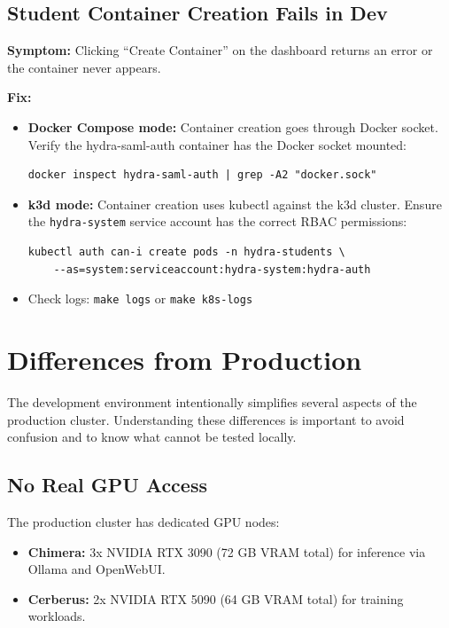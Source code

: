 \documentclass[11pt,a4paper]{article}
\newcommand{\cmdref}[1]{\texttt{#1}}
\begin{document}
\subsection{Student Container Creation Fails in Dev}

\textbf{Symptom:} Clicking ``Create Container'' on the dashboard returns
an error or the container never appears.

\textbf{Fix:}

\begin{itemize}[leftmargin=2em]
    \item \textbf{Docker Compose mode:} Container creation goes through
          Docker socket. Verify the hydra-saml-auth container has the
          Docker socket mounted:
\begin{lstlisting}[style=bash]
docker inspect hydra-saml-auth | grep -A2 "docker.sock"
\end{lstlisting}
    \item \textbf{k3d mode:} Container creation uses kubectl against the
          k3d cluster. Ensure the \texttt{hydra-system} service account
          has the correct RBAC permissions:
\begin{lstlisting}[style=bash]
kubectl auth can-i create pods -n hydra-students \
    --as=system:serviceaccount:hydra-system:hydra-auth
\end{lstlisting}
    \item Check logs: \cmdref{make logs} or \cmdref{make k8s-logs}
\end{itemize}

\section{Differences from Production}
\label{sec:differences}

The development environment intentionally simplifies several aspects of
the production cluster. Understanding these differences is important to
avoid confusion and to know what cannot be tested locally.

\subsection{No Real GPU Access}

The production cluster has dedicated GPU nodes:
\begin{itemize}[leftmargin=2em]
    \item \textbf{Chimera:} 3x NVIDIA RTX 3090 (72 GB VRAM total) for
          inference via Ollama and OpenWebUI.
    \item \textbf{Cerberus:} 2x NVIDIA RTX 5090 (64 GB VRAM total) for
          training workloads.
\end{itemize}
\end{document}
